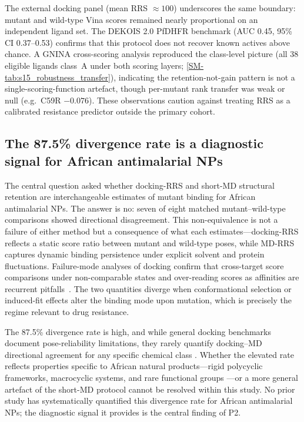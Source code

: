 \documentclass[journal=jcisd8,manuscript=article,layout=traditional]{achemso}
\begin{document}
The external docking panel (mean RRS $\approx\num{100}$) underscores the same boundary: mutant and wild-type Vina scores remained nearly proportional on an independent ligand set. The DEKOIS 2.0 PfDHFR benchmark (AUC \num{0.45}, 95\% CI \numrange{0.37}{0.53}) confirms that this protocol does not recover known actives above chance. A GNINA cross-scoring analysis reproduced the class-level picture (all \num{38} eligible ligands class~A under both scoring layers; \cref{SM-tab:s15_robustness_transfer}), indicating the retention-not-gain pattern is not a single-scoring-function artefact, though per-mutant rank transfer was weak or null (e.g.\ C59R $-0.076$). These observations caution against treating RRS as a calibrated resistance predictor outside the primary cohort.

\subsection{The 87.5\% divergence rate is a diagnostic signal for African antimalarial NPs}

The central question asked whether docking-RRS and short-MD structural retention are interchangeable estimates of mutant binding for African antimalarial NPs. The answer is no: seven of eight matched mutant--wild-type comparisons showed directional disagreement. This non-equivalence is not a failure of either method but a consequence of what each estimates---docking-RRS reflects a static score ratio between mutant and wild-type poses, while MD-RRS captures dynamic binding persistence under explicit solvent and protein fluctuations. Failure-mode analyses of docking confirm that cross-target score comparisons under non-comparable states and over-reading scores as affinities are recurrent pitfalls~\citep{kittelson2026docking,ramirez2018docking}. The two quantities diverge when conformational selection or induced-fit effects alter the binding mode upon mutation, which is precisely the regime relevant to drug resistance.

The 87.5\% divergence rate is high, and while general docking benchmarks document pose-reliability limitations, they rarely quantify docking--MD directional agreement for any specific chemical class \citep{ramirez2018docking}. Whether the elevated rate reflects properties specific to African natural products---rigid polycyclic frameworks, macrocyclic systems, and rare functional groups \citep{moyo2023prioritised}---or a more general artefact of the short-MD protocol cannot be resolved within this study. No prior study has systematically quantified this divergence rate for African antimalarial NPs; the diagnostic signal it provides is the central finding of P2.
\end{document}
